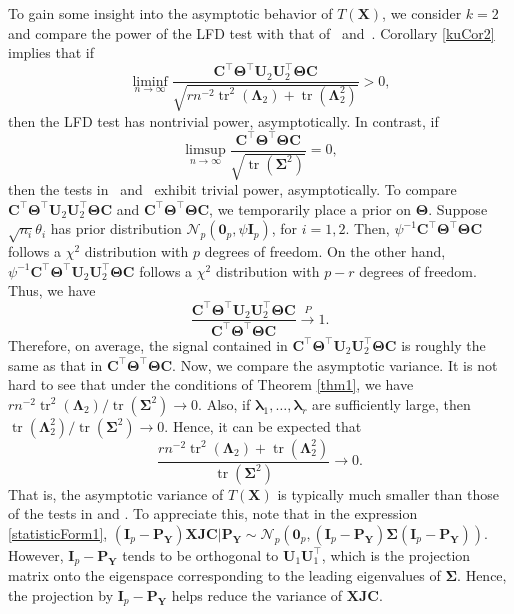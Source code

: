 \documentclass[12pt]{article} %
\DeclareMathOperator{\mytr}{tr}
\newcommand{\bX}{\mathbf{X}}
\newcommand{\bP}{\mathbf{P}}
\newcommand{\bY}{\mathbf{Y}}
\newcommand{\bJ}{\mathbf{J}}
\newcommand{\bC}{\mathbf{C}}
\newcommand{\bI}{\mathbf{I}}
\newcommand{\bU}{\mathbf{U}}
\newcommand{\bfsym}[1]{\ensuremath{\boldsymbol{#1}}}
\def\blambda {\bfsym {\lambda}}
\def\bLambda {\bfsym {\Lambda}}
\def\bSigma {\bfsym {\Sigma}}
\def\bTheta {\bfsym {\Theta}}
\theoremstyle{definition}
\begin{document}
To gain some insight into the asymptotic behavior of $T(\bX)$, we consider $k=2$ and compare the power of the LFD test with that of~\cite{Bai1996Efiect} and~\cite{Chen2010A}.
Corollary \ref{kuCor2} implies that if
\begin{equation*}
    \liminf_{n\to \infty}\frac{
    \bC^\top \bTheta^\top \bU_2 \bU_2^\top \bTheta \bC
}{
    \sqrt{
        rn^{-2} \mytr^2 (\bLambda_2) + \mytr(\bLambda_2^2)
    }
}
>0,
\end{equation*}
then the LFD test has nontrivial power, asymptotically.
In contrast, if
\begin{equation*}
    \limsup_{n\to \infty}\frac{
    \bC^\top \bTheta^\top \bTheta \bC
}{
    \sqrt{
        \mytr(\bSigma^2)
    }
}
=0,
\end{equation*}
then the tests in~\cite{Bai1996Efiect} and~\cite{Chen2010A} exhibit trivial power, asymptotically.
To compare 
$
    \bC^\top \bTheta^\top \bU_2 \bU_2^\top \bTheta \bC
$
and
$
    \bC^\top \bTheta^\top \bTheta \bC
$,
we temporarily place a prior on $\bTheta$.
Suppose $\sqrt{n_i} \theta_i$ has prior distribution $\mathcal{N}_p(\mathbf{0}_p,\psi \bI_p)$, for $i=1,2$.
Then,
$
\psi^{-1}\bC^\top \bTheta^\top \bTheta \bC$
follows a $\chi^2$ distribution with $p$ degrees of freedom.
On the other hand,
$\psi^{-1}\bC^\top \bTheta^\top \bU_2 \bU_2^\top \bTheta \bC$ follows a 
$\chi^2$ distribution with $p-r$ degrees of freedom.
Thus, we have
$$
\frac{\bC^\top \bTheta^\top \bU_2 \bU_2^\top \bTheta \bC}{\bC^\top \bTheta^\top \bTheta \bC}\xrightarrow{P}1.
$$
Therefore, on average, the signal contained in $\bC^\top \bTheta^\top \bU_2 \bU_2^\top \bTheta \bC$ is roughly the same as that in $\bC^\top \bTheta^\top \bTheta \bC$.
Now, we compare the asymptotic variance.
It is not hard to see that under the conditions of Theorem \ref{thm1}, we have
    ${rn^{-2} \mytr^2 (\bLambda_2)}/{
        \mytr(\bSigma^2)
    }\to 0$.
    Also, if $\blambda_1, \dots, \blambda_r$ are sufficiently large, then $\mytr(\bLambda_2^2)/\mytr(\bSigma^2) \to 0$.
    Hence, it can be expected that
\begin{equation*}
    \frac{rn^{-2} \mytr^2 (\bLambda_2)  + \mytr(\bLambda_2^2)}{
        \mytr(\bSigma^2)
    }\to 0.
\end{equation*}
That is, the asymptotic variance of $T(\bX)$ is typically much smaller than those of the tests in \cite{Bai1996Efiect} and \cite{Chen2010A}.
To appreciate this, note that in the expression \eqref{statisticForm1},
$(\bI_p-\bP_\bY)\bX \bJ \bC|\bP_{\bY}\sim \mathcal{N}_p(\mathbf{0}_p,(\bI_p-\bP_\bY)\bSigma(\bI_p-\bP_\bY))$.
However, $\bI_p-\bP_\bY$ tends to be orthogonal to $\bU_1 \bU_1^\top$, which is the projection matrix onto the eigenspace corresponding to the leading eigenvalues of $\bSigma$.
Hence, the projection by $\bI_p-\bP_\bY$ helps reduce the variance of $\bX \bJ \bC$.
\end{document}
